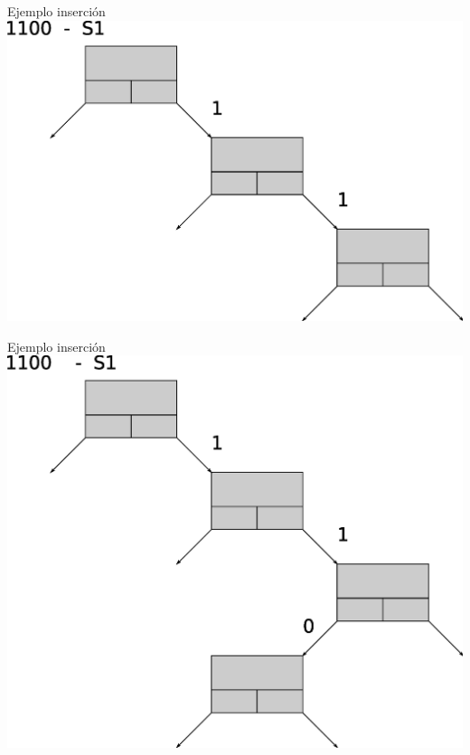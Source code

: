 \documentclass[xcolor=dvipsnames]{beamer}
\begin{document}
\begin{frame}{Ejemplo inserción} 
\center	
\includegraphics[scale=0.30]{figures/lluinsert03.eps} 
\end{frame}

\begin{frame}{Ejemplo inserción} 
\center	
\includegraphics[scale=0.30]{figures/lluinsert04.eps} 
\end{frame}
\end{document}
